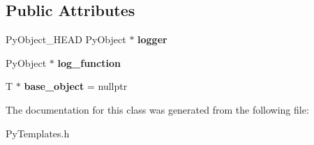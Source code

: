 \subsection*{Public Attributes}
\begin{DoxyCompactItemize}
\item 
Py\+Object\+\_\+\+H\+E\+AD Py\+Object $\ast$ {\bfseries logger}\hypertarget{class_py_template_a5b741a472639d65f9bcad29afa16ec99}{}\label{class_py_template_a5b741a472639d65f9bcad29afa16ec99}

\item 
Py\+Object $\ast$ {\bfseries log\+\_\+function}\hypertarget{class_py_template_a98bb8152faa73d028342d5cf260f0372}{}\label{class_py_template_a98bb8152faa73d028342d5cf260f0372}

\item 
T $\ast$ {\bfseries base\+\_\+object} = nullptr\hypertarget{class_py_template_ac7bf12e84289f480eaa79fd7c421614a}{}\label{class_py_template_ac7bf12e84289f480eaa79fd7c421614a}

\end{DoxyCompactItemize}


The documentation for this class was generated from the following file\+:\begin{DoxyCompactItemize}
\item 
Py\+Templates.\+h\end{DoxyCompactItemize}
